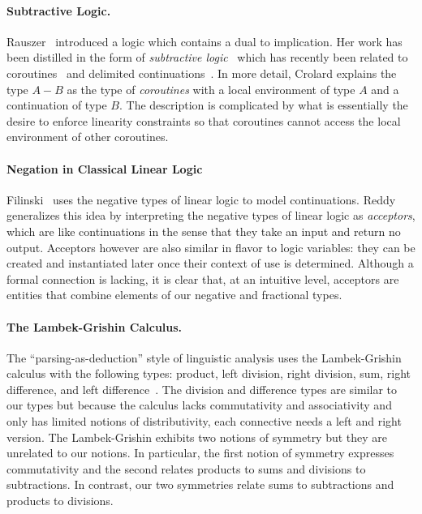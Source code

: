 \documentclass[11pt]{article}
\begin{document}
\paragraph*{Subtractive Logic.} 
Rauszer~\cite{springerlink:10.1007/BF02120864,rauszer,rauszer2} introduced a
logic which contains a dual to implication. Her work has been distilled in
the form of \emph{subtractive logic}~\cite{Crolard01} which has recently been
related to coroutines~\cite{Crolard01082004} and delimited
continuations~\cite{Ariola:2009:TFD:1743339.1743381}.  In more detail,
Crolard explains the type $A-B$ as the type of \emph{coroutines} with a local
environment of type $A$ and a continuation of type $B$. The description is
complicated by what is essentially the desire to enforce linearity
constraints so that coroutines cannot access the local environment of other
coroutines. 

\paragraph*{Negation in Classical Linear Logic} 
Filinski~\cite{Filinski92} uses the negative types of linear logic to model
continuations. Reddy~\cite{Reddy91} generalizes this idea by interpreting the
negative types of linear logic as \emph{acceptors}, which are like
continuations in the sense that they take an input and return no
output. Acceptors however are also similar in flavor to logic variables:
they can be created and instantiated later once their context of use is
determined. Although a formal connection is lacking, it is clear that, at an
intuitive level, acceptors are entities that combine elements of our negative
and fractional types.

\paragraph*{The Lambek-Grishin Calculus.} The ``parsing-as-deduction'' style
of linguistic analysis uses the Lambek-Grishin calculus with the following
types: product, left division, right division, sum, right difference, and
left difference~\cite{Bernardi:2010:CSL:1749618.1749689}. The division and
difference types are similar to our types but because the calculus lacks
commutativity and associativity and only has limited notions of
distributivity, each connective needs a left and right version. The
Lambek-Grishin exhibits two notions of symmetry but they are unrelated to our
notions. In particular, the first notion of symmetry expresses commutativity
and the second relates products to sums and divisions to subtractions. In
contrast, our two symmetries relate sums to subtractions and products to
divisions.
\end{document}
